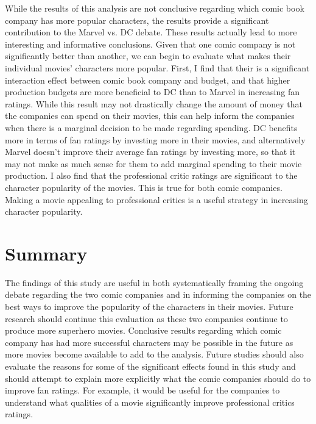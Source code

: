 \documentclass{svproc}
\begin{document}
While the results of this analysis are not conclusive regarding which comic book company has more popular characters, the results provide a significant contribution to the Marvel vs. DC debate. These results actually lead to more interesting and informative conclusions. Given that one comic company is not significantly better than another, we can begin to evaluate what makes their individual movies' characters more popular. First, I find that their is a significant interaction effect between comic book company and budget, and that higher production budgets are more beneficial to DC than to Marvel in increasing fan ratings. While this result may not drastically change the amount of money that the companies can spend on their movies, this can help inform the companies when there is a marginal decision to be made regarding spending. DC benefits more in terms of fan ratings by investing more in their movies, and alternatively Marvel doesn't improve their average fan ratings by investing more, so that it may not make as much sense for them to add marginal spending to their movie production. I also find that the professional critic ratings are significant to the character popularity of the movies. This is true for both comic companies. Making a movie appealing to professional critics is a useful strategy in increasing character popularity.

\section{Summary}

The findings of this study are useful in both systematically framing the ongoing debate regarding the two comic companies and in informing the companies on the best ways to improve the popularity of the characters in their movies. Future research should continue this evaluation as these two companies continue to produce more superhero movies. Conclusive results regarding which comic company has had more successful characters may be possible in the future as more movies become available to add to the analysis. Future studies should also evaluate the reasons for some of the significant effects found in this study and should attempt to explain more explicitly what the comic companies should do to improve fan ratings. For example, it would be useful for the companies to understand what qualities of a movie significantly improve professional critics ratings. 
\end{document}
